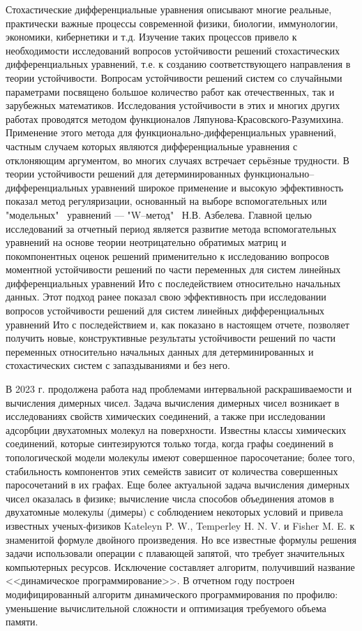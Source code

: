 Стохастические дифференциальные уравнения описывают многие реальные, практически важные процессы современной физики, биологии, иммунологии, экономики, кибернетики и т.д. Изучение таких процессов привело к необходимости исследований вопросов устойчивости решений стохастических дифференциальных
уравнений, т.е. к созданию соответствующего направления в теории устойчивости. 
Вопросам устойчивости решений систем со случайными параметрами посвящено большое количество работ как отечественных, так и
зарубежных математиков. Исследования устойчивости в этих и многих других
работах проводятся методом функционалов Ляпунова-Красовского-Разумихина. Применение этого метода для функционально-дифференциальных уравнений, частным случаем которых являются дифференциальные уравнения с отклоняющим аргументом, во многих случаях встречает серьёзные трудности. В теории устойчивости решений для детерминированных функционально--дифференциальных
уравнений широкое применение и высокую эффективность показал метод регуляризации, основанный на выборе вспомогательных или "модельных"
{\,} уравнений  --- "W--метод" {\,} Н.В. Азбелева.
Главной целью исследований за отчетный период является развитие метода вспомогательных уравнений на основе теории
неотрицательно обратимых матриц и покомпонентных оценок решений применительно к исследованию вопросов моментной устойчивости решений
по части переменных для систем линейных дифференциальных уравнений Ито с последействием относительно начальных данных. Этот подход
ранее показал свою эффективность при исследовании вопросов устойчивости решений для систем линейных дифференциальных уравнений
Ито с последействием и, как показано в настоящем отчете, позволяет получить новые, конструктивные результаты устойчивости решений по
части переменных относительно начальных данных для детерминированных и стохастических систем с запаздываниями и без него.

В 2023 г. продолжена работа над проблемами интервальной раскрашиваемости и вычисления димерных чисел.
Задача вычисления димерных чисел возникает в исследованиях свойств химических соединений, а также при исследовании адсорбции двухатомных молекул на поверхности.
Известны классы химических соединений, которые синтезируются только тогда, когда графы соединений в топологической модели молекулы имеют совершенное паросочетание; более того, стабильность компонентов этих семейств зависит от количества совершенных паросочетаний в их графах.
Еще более актуальной задача вычисления димерных чисел оказалась в физике; вычисление числа способов объединения атомов в двухатомные молекулы (димеры) с соблюдением некоторых условий и привела известных ученых-физиков Kateleyn P. W., Temperley H. N. V. и Fisher M. E. к знаменитой формуле двойного произведения. Но все известные формулы решения задачи использовали операции с плавающей запятой, что требует значительных компьютерных ресурсов.
Исключение составляет алгоритм, получивший название <<динамическое программирование>>. В отчетном году построен модифицированный алгоритм динамического программирования по профилю: уменьшение вычислительной сложности и оптимизация требуемого объема памяти.


